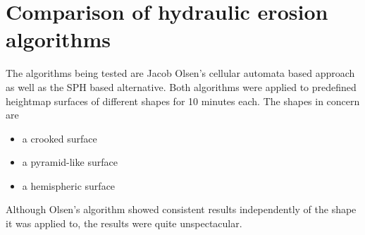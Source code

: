 \documentclass[11pt,a4paper,twoside,openright]{report}
\begin{document}
\section{Comparison of hydraulic erosion algorithms}
The algorithms being tested are Jacob Olsen's cellular automata based approach as well as the SPH based alternative. Both algorithms were applied to predefined heightmap surfaces of different shapes for 10 minutes each. The shapes in concern are
\begin{itemize}
\item a crooked surface
\item a pyramid-like surface
\item a hemispheric surface
\end{itemize}
Although Olsen's algorithm showed consistent results independently of the shape it was applied to, the results were quite unspectacular.
\end{document}
